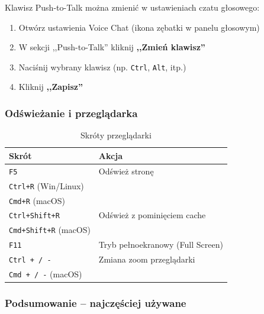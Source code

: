 \documentclass[12pt,a4paper]{article}
\begin{document}
\begin{tcolorbox}[colback=green!5!white,colframe=green!75!black,title=\faInfoCircle\ Konfiguracja Push-to-Talk]
Klawisz Push-to-Talk można zmienić w ustawieniach czatu głosowego:
\begin{enumerate}
    \item Otwórz ustawienia Voice Chat (ikona zębatki w panelu głosowym)
    \item W sekcji ,,Push-to-Talk'' kliknij \textbf{,,Zmień klawisz''}
    \item Naciśnij wybrany klawisz (np. \texttt{Ctrl}, \texttt{Alt}, itp.)
    \item Kliknij \textbf{,,Zapisz''}
\end{enumerate}
\end{tcolorbox}

\subsubsection{Odświeżanie i przeglądarka}

\begin{table}[H]
\centering
\begin{tabular}{|l|l|}
\hline
\textbf{Skrót} & \textbf{Akcja} \\
\hline
\texttt{F5} & Odśwież stronę \\
\texttt{Ctrl+R} (Win/Linux) & \\
\texttt{Cmd+R} (macOS) & \\
\hline
\texttt{Ctrl+Shift+R} & Odśwież z pominięciem cache \\
\texttt{Cmd+Shift+R} (macOS) & \\
\hline
\texttt{F11} & Tryb pełnoekranowy (Full Screen) \\
\hline
\texttt{Ctrl + / -} & Zmiana zoom przeglądarki \\
\texttt{Cmd + / -} (macOS) & \\
\hline
\end{tabular}
\caption{Skróty przeglądarki}
\end{table}

\subsubsection{Podsumowanie -- najczęściej używane}
\end{document}
